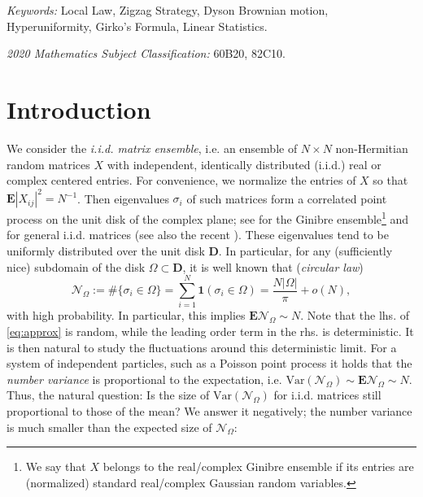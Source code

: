 \documentclass[10pt]{amsart}
\numberwithin{equation}{section}
\newcommand{\E}{\mathbf{E}}
\begin{document}
\footnotesize \textit{Keywords:} Local Law, Zigzag Strategy, Dyson Brownian motion, Hyperuniformity, Girko’s Formula, Linear Statistics.

\footnotesize \textit{2020 Mathematics Subject Classification:} 60B20, 82C10.
%
\vspace{0.25cm}
%
\normalsize


\tableofcontents


\section{Introduction}

We consider the \emph{i.i.d. matrix ensemble}, i.e. an ensemble of $N\times N$ non-Hermitian random matrices $X$ with independent, identically distributed (i.i.d.) real or complex centered entries. For convenience, we normalize the entries of $X$ so that $\E |X_{ij}|^2=N^{-1}$. Then eigenvalues $\sigma_i$ of such matrices form a correlated point process on the unit disk of the complex plane; see \cite{borodin2009ginibre, Ginibre65} for the Ginibre ensemble\footnote{We say that $X$ belongs to the real/complex Ginibre ensemble if its entries are (normalized) standard real/complex Gaussian random variables.} and \cite{nonherm_edge_univ, dubova2025bulk, maltsev2023bulk, osman2025bulk} for general i.i.d. matrices (see also the recent \cite{afanasiev2024universality, campbell2025spectral, cipolloni2025non, liu2023critical, liu2025repeated, zhang2024bulk}). These eigenvalues tend to be uniformly distributed over the unit disk $\mathbf{D}$. In particular, for any (sufficiently nice) subdomain of the disk $\Omega\subset\mathbf{D}$, it is well known \cite{bai1997circular, Girko84, gotze2010circular, pan2010circular, tao2008random} that (\emph{circular law})
\begin{equation}
\label{eq:approx}
\mathcal{N}_\Omega:=\#\big\{\sigma_i\in \Omega\big\}=\sum_{i=1}^N \bm1(\sigma_i\in \Omega)=\frac{N|\Omega|}{\pi}+o(N),
\end{equation}
with high probability. In particular, this implies $\E \mathcal{N}_\Omega\sim N$. Note that the lhs. of \eqref{eq:approx} is random, while the leading order term in the rhs. is deterministic. It is then natural to study the fluctuations around this deterministic limit. 
For a system of independent particles, such as a Poisson point process it holds that the \emph{number variance} is proportional to the expectation, i.e. $\mathrm{Var}(\mathcal{N}_\Omega)\sim \E\mathcal{N}_\Omega\sim N$. Thus, the natural question: Is the size of $\mathrm{Var}(\mathcal{N}_\Omega)$ for i.i.d. matrices still proportional to those of the mean? We answer it negatively; 
the number variance is much smaller than the expected size of $\mathcal{N}_\Omega$:
\end{document}
